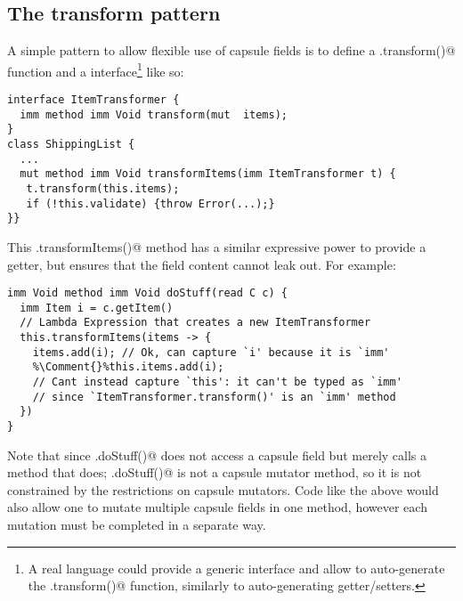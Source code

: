 \subsection{The transform pattern}
A simple pattern to allow flexible use of capsule fields is to define a \Q@.transform()@ function and a \Q@ItemTransformer@ interface\footnote{A real language could
provide a generic \Q@Transformer@ interface and allow to auto-generate the \Q@.transform()@ function, similarly to auto-generating getter/setters.} like so:


%
%
%
%
%
%
%

\saveSpace
\begin{lstlisting}
interface ItemTransformer { 
  imm method imm Void transform(mut  items);
}
class ShippingList {
  ...
  mut method imm Void transformItems(imm ItemTransformer t) {
   t.transform(this.items);
   if (!this.validate) {throw Error(...);}
}}
\end{lstlisting}
This \Q@.transformItems()@ method 
has a similar expressive power to provide a
\Q@mut@ getter, but ensures that 
the field content cannot leak out.
For example:
\begin{lstlisting}[escapechar=\%]
imm Void method imm Void doStuff(read C c) {
  imm Item i = c.getItem()
  // Lambda Expression that creates a new ItemTransformer
  this.transformItems(items -> {
    items.add(i); // Ok, can capture `i' because it is `imm'
    %\Comment{}%this.items.add(i);
    // Cant instead capture `this': it can't be typed as `imm'
    // since `ItemTransformer.transform()' is an `imm' method
  })
}
\end{lstlisting}

Note that since \Q@.doStuff()@ does not access a capsule field but merely calls a method that does;
\Q@.doStuff()@ is not a capsule mutator method, so it is not constrained by the restrictions on capsule mutators. Code like the above would also allow one to mutate multiple capsule fields in one method, however each mutation must be completed in a separate way.%


